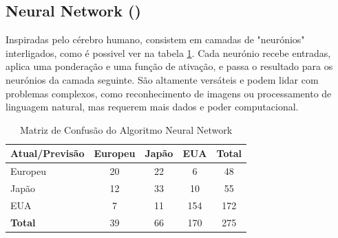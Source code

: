\documentclass[conference]{IEEEtran}
\begin{document}
\subsection{Neural Network (\cite{neural})}
Inspiradas pelo cérebro humano, consistem em camadas de "neurónios" interligados, como é possivel ver na tabela \ref{tab:conf_matrix_neural}.
Cada neurónio recebe entradas, aplica uma ponderação e uma função de ativação, e passa o resultado para os neurónios da camada seguinte.
São altamente versáteis e podem lidar com problemas complexos, como reconhecimento de imagens ou processamento de linguagem natural,
mas requerem mais dados e poder computacional.
\begin{table}[!ht]
	\centering
	\begin{tabular}{lcccc}
		\toprule
		\textbf{Atual/Previsão} & \textbf{Europeu} & \textbf{Japão} & \textbf{EUA} & \textbf{Total} \\
		\midrule
		Europeu                 & 20               & 22             & 6            & 48             \\
		Japão                   & 12               & 33             & 10           & 55             \\
		EUA                     & 7                & 11             & 154          & 172            \\
		\midrule
		\textbf{Total}          & 39               & 66             & 170          & 275            \\
		\bottomrule
	\end{tabular}
	\caption{Matriz de Confusão do Algoritmo Neural Network}
	\label{tab:conf_matrix_neural}

\end{table}

\end{document}
